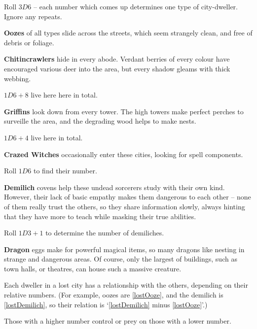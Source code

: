 \begin{multicols}{2}

Roll $3D6$ -- each number which comes up determines one type of city-dweller.
Ignore any repeats.

\begin{dlist}
  \item\label{lostOoze}
  \textbf{Oozes} of all types slide across the streets, which seem strangely clean, and free of debris or foliage.
  \item
  \textbf{Chitincrawlers} hide in every abode.
  Verdant berries of every colour have encouraged various deer into the area, but every shadow gleams with thick webbing.

  $1D6+8$ live here here in total.
  \item
  \textbf{Griffins} look down from every tower.
  The high towers make perfect perches to surveille the area, and the degrading wood helps to make nests.

  $1D6+4$ live here in total.
  \item
  \textbf{Crazed Witches} occasionally enter these cities, looking for spell components.

  Roll $1D6$ to find their number.
  \item\label{lostDemilich}
  \textbf{Demilich} covens help these undead sorcerers study with their own kind.
  However, their lack of basic empathy makes them dangerous to each other -- none of them really trust the others, so they share information slowly, always hinting that they have more to teach while masking their true abilities.

  Roll $1D3 + 1$ to determine the number of demiliches.
  \item
  \textbf{Dragon} eggs make for powerful magical items, so many dragons like nesting in strange and dangerous areas.
  Of course, only the largest of buildings, such as town halls, or theatres, can house such a massive creature.
\end{dlist}

Each dweller in a lost city has a relationship with the others, depending on their relative numbers.
(For example, oozes are \ref{lostOoze}, and the demilich is \ref{lostDemilich}, so their relation is `\ref{lostDemilich} minus \ref{lostOoze}'.)

Those with a higher number control or prey on those with a lower number.


\end{multicols}
